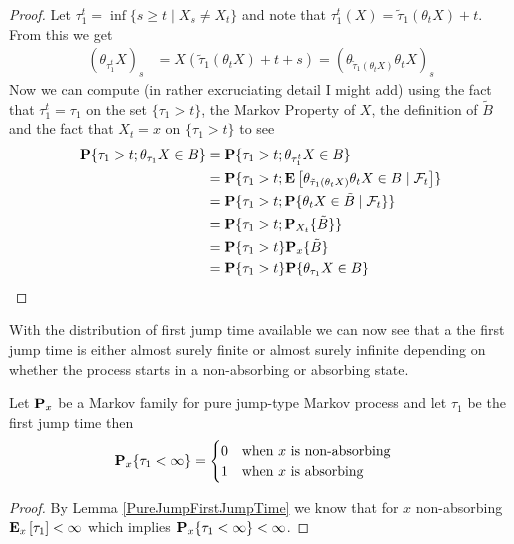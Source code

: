 \begin{proof}
Let $\tau^t_1 = \inf \lbrace s \geq
t \mid X_s \neq X_t \rbrace$ and note that $\tau^t_1(X) =
\tilde{\tau}_1(\theta_t X) + t$.   From this we get
\begin{align*}
\left( \theta_{\tau^t_1}X \right)_s &=
X(\tilde{\tau}_1(\theta_tX) + t + s) = \left(\theta_{\tilde{\tau}_1(\theta_t X)} \theta_tX
\right)_s
\end{align*} 
Now we can compute (in rather excruciating detail I might add) using
the fact that $\tau^t_1 = \tau_1$ on the set $\lbrace \tau_1 >
t \rbrace$, the Markov Property of $X$, the definition of $\tilde{B}$ and the fact that $X_t = x$ on
$\lbrace \tau_1 > t \rbrace$ to see
\begin{align*}
\probability{\tau_1 > t ; \theta_{\tau_1}X \in B}
&=
\probability{\tau_1 > t ; \theta_{\tau^t_1}X \in B}\\
&=
\probability{\tau_1 > t ;
  \cexpectationlong{\mathcal{F}_t}{\theta_{\tilde{\tau}_1(\theta_t X)} \theta_t X \in B}}\\
&=
\probability{\tau_1 > t ;
  \cprobability{\mathcal{F}_t}{\theta_t X \in \tilde{B}}}\\
&=
\probability{\tau_1 > t ;
  \sprobability{\tilde{B}}{X_t}}\\
&= \probability{\tau_1 > t } \sprobability{\tilde{B}}{x}\\
&= \probability{\tau_1 > t } \probability{\theta_{\tau_1} X \in B}\\
\end{align*}
\end{proof}

With the distribution of first jump time available we can now see that
a the first jump time is either almost surely finite or almost surely
infinite depending on whether the process starts in a non-absorbing or
absorbing state.
\begin{cor}\label{AbsorbingDichotomy}Let $\probabilityop_x$ be a
  Markov family for pure jump-type Markov process and let $\tau_1$ be
  the first jump time then
\begin{align*}
\sprobability{\tau_1 < \infty} {x} &= \begin{cases}
0 & \text{when $x$ is non-absorbing} \\
1 & \text{when $x$ is absorbing}
\end{cases}
\end{align*}
\end{cor}
\begin{proof}
By Lemma \ref{PureJumpFirstJumpTime} we know that for $x$
non-absorbing $\sexpectation{\tau_1}{x} < \infty$ which implies
$\sprobability{\tau_1 < \infty}{x} < \infty$.  
\end{proof}

